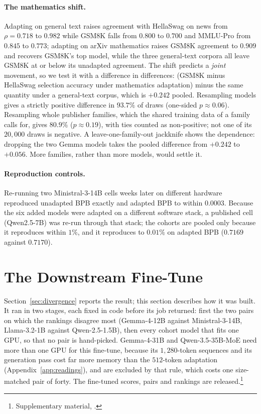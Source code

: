\documentclass[10pt]{article}
\newcommand{\repourl}{https://github.com/DavidAfonsoValente/entropy-bench}
\newcommand{\repolink}[1]{\expandafter\url\expandafter{\detokenize\expandafter{\repourl#1}}}
\newcommand{\artifact}[1]{\footnote{Supplementary material, \texttt{\detokenize{#1}}.}}
\newcommand{\artifact}[1]{\footnote{\repolink{/tree/main/#1}}}
\begin{document}
\paragraph{The mathematics shift.} Adapting on general text raises agreement with HellaSwag on news
from $\rho = 0.718$ to $0.982$ while GSM8K falls from $0.800$ to $0.700$ and MMLU-Pro from $0.845$ to
$0.773$; adapting on arXiv mathematics raises GSM8K agreement to $0.909$ and recovers GSM8K's top
model, while the three general-text corpora all leave GSM8K at or below its unadapted agreement. The
shift predicts a \emph{joint} movement, so we test it with a difference in differences: (GSM8K minus
HellaSwag selection accuracy under mathematics adaptation) minus the same quantity under a
general-text corpus, which is $+0.242$ pooled. Resampling models gives a strictly positive difference
in $93.7\%$ of draws (one-sided $p \approx 0.06$). Resampling whole publisher families, which the
shared training data of a family calls for, gives $80.9\%$ ($p \approx 0.19$), with ties counted as
non-positive; not one of its $20{,}000$ draws is negative. A leave-one-family-out jackknife shows the
dependence: dropping the two Gemma models takes the pooled difference from $+0.242$ to $+0.056$.
More families, rather than more models, would settle it.

\paragraph{Reproduction controls.} Re-running two Ministral-3-14B cells weeks later on different
hardware reproduced unadapted BPB exactly and adapted BPB to within $0.0003$. Because the six added
models were adapted on a different software stack, a published cell (Qwen2.5-7B) was re-run through
that stack; the cohorts are pooled only because it reproduces within $1\%$, and it reproduces to
$0.01\%$ on adapted BPB ($0.7169$ against $0.7170$).

\section{The Downstream Fine-Tune}
\label{sec:downstream}
Section~\ref{sec:divergence} reports the result; this section describes how it was built. It ran in
two stages, each fixed in code before its job returned: first the two pairs on which the rankings
disagree most (Gemma-4-12B against Ministral-3-14B, Llama-3.2-1B against Qwen-2.5-1.5B), then every
cohort model that fits one GPU, so that no pair is hand-picked. Gemma-4-31B and Qwen-3.5-35B-MoE need
more than one GPU for this fine-tune, because its $1{,}280$-token sequences and its generation pass
cost far more memory than the $512$-token adaptation (Appendix~\ref{app:readings}), and are excluded by
that rule, which costs one size-matched pair of forty. The fine-tuned scores, pairs and rankings
are released.\artifact{results/downstream.json}
\end{document}
